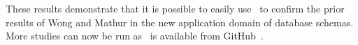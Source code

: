 
These results demonstrate that it is possible to easily use \mr~to confirm the prior results of Wong and Mathur in the
new application domain of database schemas. More studies can now be run as \mr~is available from GitHub~\cite{tool}.



